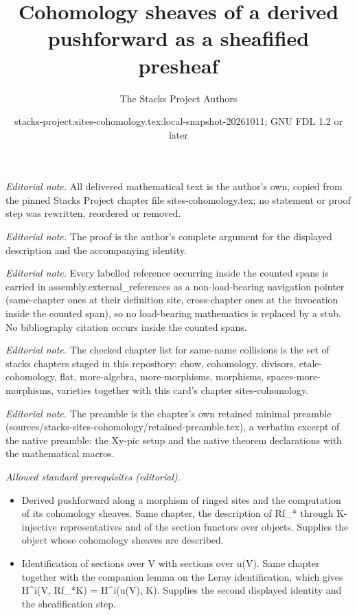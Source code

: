 \documentclass[10pt,a4paper]{amsart}
\title{Cohomology sheaves of a derived pushforward as a sheafified presheaf}
\author{The Stacks Project Authors}
\date{stacks-project:sites-cohomology.tex:local-snapshot-20261011; GNU FDL 1.2 or later}
\theoremstyle{plain}
\theoremstyle{definition}
\theoremstyle{remark}
\numberwithin{equation}{subsection}
\begin{document}
\maketitle
\noindent\textit{Editorial note.} All delivered mathematical text is the author's own, copied from the pinned Stacks Project chapter file sites-cohomology.tex; no statement or proof step was rewritten, reordered or removed.\par\medskip
\noindent\textit{Editorial note.} The proof is the author's complete argument for the displayed description and the accompanying identity.\par\medskip
\noindent\textit{Editorial note.} Every labelled reference occurring inside the counted spans is carried in assembly.external\_references as a non-load-bearing navigation pointer (same-chapter ones at their definition site, cross-chapter ones at the invocation inside the counted span), so no load-bearing mathematics is replaced by a stub. No bibliography citation occurs inside the counted spans.\par\medskip
\noindent\textit{Editorial note.} The checked chapter list for same-name collisions is the set of stacks chapters staged in this repository: chow, cohomology, divisors, etale-cohomology, flat, more-algebra, more-morphisms, morphisms, spaces-more-morphisms, varieties together with this card's chapter sites-cohomology.\par\medskip
\noindent\textit{Editorial note.} The preamble is the chapter's own retained minimal preamble (sources/stacks-sites-cohomology/retained-preamble.tex), a verbatim excerpt of the native preamble: the Xy-pic setup and the native theorem declarations with the mathematical macros.\par\medskip
\noindent\textit{Allowed standard prerequisites (editorial).}\begin{itemize}
\item Derived pushforward along a morphism of ringed sites and the computation of its cohomology sheaves. Same chapter, the description of Rf\_* through K-injective representatives and of the section functors over objects. Supplies the object whose cohomology sheaves are described.
\item Identification of sections over V with sections over u(V). Same chapter together with the companion lemma on the Leray identification, which gives H\textasciicircum{}i(V, Rf\_*K) = H\textasciicircum{}i(u(V), K). Supplies the second displayed identity and the sheafification step.
\end{itemize}\medskip
\end{document}
